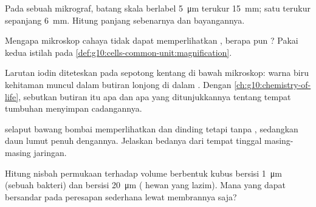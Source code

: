 \begin{exercise}[$\star\star$]\label{exo:g10:cells-common-unit:6}
Pada sebuah mikrograf, batang skala berlabel \qty{5}{\micro m} terukur
\qty{15}{mm}; satu  terukur sepanjang \qty{6}{mm}. Hitung
panjang  sebenarnya dan  bayangannya.
\end{exercise}

\begin{exercise}[$\star\star$]\label{exo:g10:cells-common-unit:7}
Mengapa mikroskop cahaya tidak dapat memperlihatkan , berapa pun
? Pakai kedua istilah pada
\cref{def:g10:cells-common-unit:magnification}.
\end{exercise}

\begin{exercise}[$\star\star$]\label{exo:g10:cells-common-unit:8}
Larutan iodin diteteskan pada sepotong kentang di bawah mikroskop:
warna biru kehitaman muncul dalam butiran lonjong di dalam .
Dengan \cref{ch:g10:chemistry-of-life}, sebutkan butiran itu apa dan
apa yang ditunjukkannya tentang tempat tumbuhan menyimpan cadangannya.
\end{exercise}

\begin{exercise}[$\star\star$]\label{exo:g10:cells-common-unit:9}
 selaput bawang bombai memperlihatkan  dan dinding tetapi
tanpa , sedangkan  daun lumut penuh dengannya. Jelaskan
bedanya dari tempat tinggal masing-masing jaringan.
\end{exercise}

\begin{exercise}[$\star\star$]\label{exo:g10:cells-common-unit:10}
Hitung nisbah permukaan terhadap volume  berbentuk kubus bersisi
\qty{1}{\micro m} (sebuah bakteri) dan bersisi \qty{20}{\micro m}
( hewan yang lazim). Mana yang dapat bersandar pada
peresapan sederhana lewat membrannya saja?
\end{exercise}


